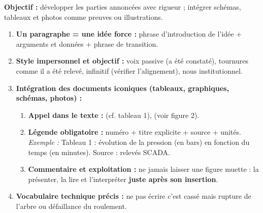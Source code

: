 \documentclass[11pt]{article}
\newcommand{\cle}[1]{{\popxbold\color{popdark}#1}}
\begin{document}
\begin{methode}
    \textbf{Objectif :} développer les parties annoncées avec rigueur ; intégrer schémas, tableaux et photos comme \cle{preuves} ou \cle{illustrations}.
    \begin{enumerate}
        \item \textbf{Un paragraphe = une idée force :} phrase d'introduction de l'idée + arguments et données + phrase de transition.
        \item \textbf{Style impersonnel et objectif :} voix passive (\og a été constaté\fg), tournures comme \og il a été relevé\fg, infinitif (\og vérifier l'alignement\fg), \og nous\fg{} institutionnel.
        \item \textbf{Intégration des documents iconiques (tableaux, graphiques, schémas, photos) :}
        \begin{enumerate}
            \item \textbf{Appel dans le texte :} \og (cf. tableau 1)\fg, \og (voir figure 2)\fg.
            \item \textbf{Légende obligatoire :} numéro + titre explicite + source + unités. \emph{Exemple :} \og Tableau 1 : évolution de la pression (en bars) en fonction du temps (en minutes). Source : relevés SCADA.\fg
            \item \textbf{Commentaire et exploitation :} ne jamais laisser une figure \og muette\fg{} : la présenter, la lire et l'interpréter \textbf{juste après son insertion}.
        \end{enumerate}
        \item \textbf{Vocabulaire technique précis :} ne pas écrire \og c'est cassé\fg{} mais \og rupture de l'arbre\fg{} ou \og défaillance du roulement\fg.
    \end{enumerate}
\end{methode}
\end{document}
